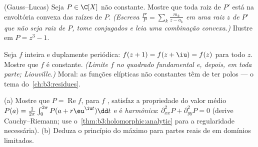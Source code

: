 \begin{exercise}[$\star\star\star$]\label{exo:b3:holomorphic:8}
(Gauss--Lucas) Seja $P \in \C[X]$ não constante. Mostre que toda raiz de
$P'$ está na envoltória convexa das raízes de $P$. \emph{(Escreva
$\frac{P'}{P} = \sum_k\frac{m_k}{z - a_k}$ em uma raiz $z$ de $P'$ que não seja raiz de $P$, tome
conjugados e leia uma combinação convexa.)} Ilustre em $P = z^3 - 1$.
\end{exercise}

\begin{exercise}[$\star\star\star$]\label{exo:b3:holomorphic:9}
Seja $f$ inteira e duplamente periódica: $f(z + 1) = f(z + \iu)
= f(z)$ para todo $z$.
Mostre que $f$ é constante. \emph{(Limite $f$ no quadrado
fundamental  e, depois, em toda parte; Liouville.)} Moral: as
funções elípticas não constantes têm de ter polos --- o tema do~\cref{ch:b3:residues}.
\end{exercise}

\begin{exercise}[$\star\star$]\label{exo:b3:holomorphic:10}
(a) Mostre que $P = \operatorname{Re}f$, para $f$ , satisfaz a propriedade do
valor médio $P(a) =
\frac1{2\pi}\int_0^{2\pi}P(a + r\eu^{\iu t})\dd t$ e é \emph{harmônica}: $\partial^2_{xx}P + \partial^2_{yy}P = 0$ (derive Cauchy--Riemann;
use o~\cref{thm:b3:holomorphic:analytic} para a regularidade necessária).
(b) Deduza o princípio do máximo para partes reais de  em domínios limitados.
\end{exercise}

